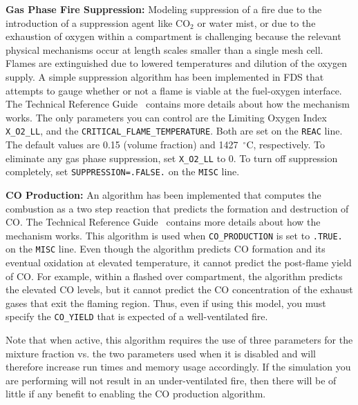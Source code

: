 \documentclass[11pt]{book}
\newcommand{\ct}{\tt\small}
\begin{document}
\vspace{\baselineskip}
\noindent
{\bf Gas Phase Fire Suppression:} 
Modeling suppression of a fire due to the introduction of a suppression
agent like CO$_2$ or water mist, or due to the exhaustion of oxygen
within a compartment is challenging because
the relevant physical mechanisms occur at length scales smaller than a
single mesh cell. Flames are extinguished due to lowered
temperatures and dilution of the oxygen supply. A simple
suppression algorithm has been implemented in FDS that attempts to
gauge whether or not a flame is viable at the fuel-oxygen interface. The Technical Reference Guide~\cite{FDS_Tech_Guide_5}
contains more details about how the mechanism works. The only
parameters you can control are the Limiting
Oxygen Index {\ct X\_O2\_LL},
and the {\ct CRITICAL\_FLAME\_TEMPERATURE}. Both are
set on the {\ct REAC} line.
The default values are 0.15 (volume fraction) and 1427~$^\circ$C, respectively.
To eliminate any gas phase suppression, set {\ct X\_O2\_LL} to 0. To turn off suppression completely,
set {\ct SUPPRESSION=.FALSE.} on the {\ct MISC} line.

\vspace{\baselineskip}
\noindent
{\bf CO Production:} 
An algorithm has been implemented that computes the combustion as a two step reaction that
predicts the formation and destruction of CO.  The Technical Reference Guide~\cite{FDS_Tech_Guide_5}
contains more details about how the mechanism works. This algorithm is used when
{\ct CO\_PRODUCTION} is set to {\ct .TRUE.} on the {\ct MISC} line. Even though the algorithm predicts
CO formation and its eventual oxidation at elevated temperature, it cannot predict the post-flame
yield of CO. For example, within a flashed over compartment, the algorithm predicts the elevated
CO levels, but it cannot predict the CO concentration of the exhaust gases that exit the flaming region.
Thus, even if using this model, you must specify the {\ct CO\_YIELD} that is expected of a well-ventilated fire.

\begin{warning}
\noindent
Note that when active, this algorithm requires the use of three parameters
for the mixture fraction vs. the two parameters used when it is disabled and will therefore
increase run times and memory usage accordingly.  If the simulation you are
performing will not result in an under-ventilated fire, then there will be of
little if any benefit to enabling the CO production algorithm.
\end{warning}
\end{document}
